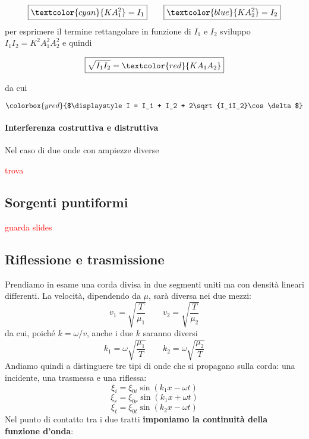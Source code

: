 \documentclass[x11names]{article}
\newcommand{\viola}[1]{\colorbox{yred}{$\displaystyle #1$}}
\begin{document}
		\[ 
		\boxed{\textcolor{cyan}{KA_1^2}= I_1} \qquad \boxed{\textcolor{blue}{KA_2^2} = I_2 } 
		\]
		per esprimere il termine rettangolare in funzione di \(I_1\) e \(I_2\) sviluppo \(I_1I_2 = K^2A_1^2A_2^2\) e quindi
		
		\[ 
		\boxed{\sqrt{I_1I_2} = \textcolor{red}{KA_1A_2}}
		\]
		
		da cui
		
		\begin{equation}
			\viola{I = I_1 + I_2 + 2\sqrt{I_1I_2}\cos\delta}
		\end{equation}
		
		
		\begin{es}{}
			\paragraph{Interferenza costruttiva e distruttiva}
			Nel caso di due onde con ampiezze diverse 
			\begin{center}
				\textcolor{red}{trova}
			\end{center}
			
		\end{es}
		
		
		\subsection{Sorgenti puntiformi}
			\begin{center}
				\textcolor{red}{guarda slides}
			\end{center}
			
		\newpage
		\subsection{Riflessione e trasmissione}
		Prendiamo in esame una corda divisa in due segmenti uniti ma con densità lineari differenti. La velocità, dipendendo da \(\mu\), sarà diversa nei due mezzi:
		\[ 
		v_1 = \sqrt{\frac{T}{\mu_1}} \qquad v_2 = \sqrt{\frac{T}{\mu_2}} 
		\]
		da cui, poiché \(k = \omega / v\), anche i due \(k\) saranno diversi
		\[ 
		k_1 = \omega \sqrt{\frac{\mu_1}{T}} \qquad k_2 = \omega \sqrt{\frac{\mu_2}{T}} 
		\]
		Andiamo quindi a distinguere tre tipi di onde che si propagano sulla corda: una incidente, una trasmessa e una riflessa:
		\[ 
		\xi_i = \xi_{0i}\sin\left(k_1 x - \omega t\right)
		\]
		\[ 
		\xi_r = \xi_{0r}\sin\left(k_1 x + \omega t\right)
		\]
		\[ 
		\xi_t = \xi_{0t}\sin\left(k_2 x - \omega t\right)
		\]
		Nel punto di contatto tra i due tratti \textbf{imponiamo la continuità della funzione d'onda}:
		
\end{document}
